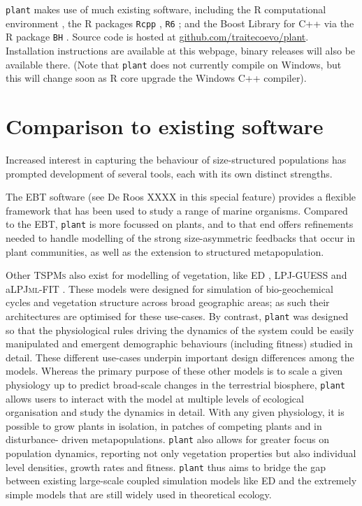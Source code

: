 \documentclass[a4paper,11pt]{article}
\newcommand{\plant}{\texttt{plant}}
\begin{document}
{\plant} makes use of much existing software, including the R
computational environment \citep{R-2015}, the R packages \texttt{Rcpp}
\citep{Eddelbuettel-2011, Eddelbuettel-2013}, \texttt{R6}
\citep{Chang-2014}; and the Boost Library for C++
\citep{Schaling-2014} via the R package \texttt{BH}
\citep{Eddelbuettel-2015}. Source code is hosted at
\href{https://github.com/traitecoevo/plant}{github.com/traitecoevo/plant}.
Installation instructions are available at this webpage, binary
releases will also be available there.  (Note that {\plant} does not
currently compile on Windows, but this will change soon as R core
upgrade the Windows C++ compiler).

\section{Comparison to existing software}


Increased interest in capturing the behaviour of size-structured  populations
has prompted development of several tools, each with its own distinct
strengths. 

The \textsc{EBT} software (see De Roos XXXX in this special feature) provides 
a flexible framework that has been used to study a range of marine organisms.
Compared to the \textsc{EBT}, {\plant} is more focussed on plants, and 
to that end offers refinements needed to handle modelling of the strong 
size-asymmetric feedbacks that occur in plant communities, as well as the 
extension to structured metapopulation.

Other \textsc{TSPMs} also exist for modelling of vegetation, like \textsc{ED}
\citep[ver 1 and 2][]{Moorcroft-2001, Medvigy-2009}, \textsc {LPJ-GUESS}
\citep{Smith-2014} and a\textsc{LPJml-FIT}  \citep{Sakschewski-2015}. These
models were designed for simulation of bio-geochemical cycles and vegetation
structure across broad geographic areas; as such their architectures are
optimised for these use-cases. By contrast, {\plant} was  designed so that the
physiological rules driving the dynamics of the system could be easily
manipulated and emergent demographic behaviours (including fitness) studied in
detail.
These different use-cases underpin important design differences among
the models. Whereas the primary purpose of these other models is to scale a
given physiology up to predict  broad-scale changes in the terrestrial
biosphere, {\plant} allows users to  interact with the model at multiple
levels of ecological organisation and  study the dynamics in detail. With any
given physiology, it is possible to  grow plants in isolation, in patches of
competing plants and in disturbance- driven metapopulations. {\plant} also
allows for greater focus on population dynamics, reporting not only vegetation
properties but also individual level densities, growth rates and fitness.
{\plant} thus aims to bridge the gap between existing large-scale coupled
simulation models like \textsc{ED} and the extremely simple models that are
still widely  used in theoretical ecology. 
\end{document}
